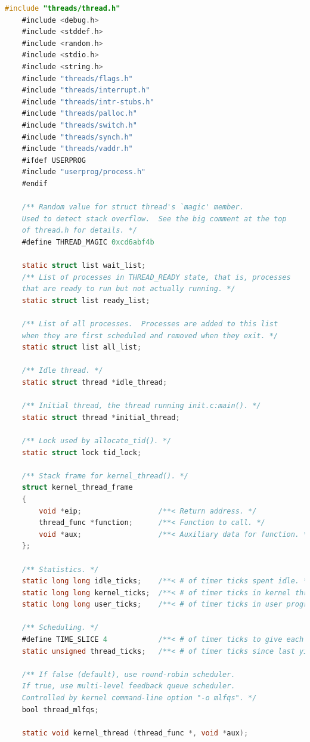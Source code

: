 \documentclass{article}
\begin{document}
\begin{lstlisting}[language=C, title=\texttt{pintos/src/threads/thread.c}]
	#include "threads/thread.h"
	#include <debug.h>
	#include <stddef.h>
	#include <random.h>
	#include <stdio.h>
	#include <string.h>
	#include "threads/flags.h"
	#include "threads/interrupt.h"
	#include "threads/intr-stubs.h"
	#include "threads/palloc.h"
	#include "threads/switch.h"
	#include "threads/synch.h"
	#include "threads/vaddr.h"
	#ifdef USERPROG
	#include "userprog/process.h"
	#endif
	
	/** Random value for struct thread's `magic' member.
	Used to detect stack overflow.  See the big comment at the top
	of thread.h for details. */
	#define THREAD_MAGIC 0xcd6abf4b
	
	static struct list wait_list;
	/** List of processes in THREAD_READY state, that is, processes
	that are ready to run but not actually running. */
	static struct list ready_list;
	
	/** List of all processes.  Processes are added to this list
	when they are first scheduled and removed when they exit. */
	static struct list all_list;
	
	/** Idle thread. */
	static struct thread *idle_thread;
	
	/** Initial thread, the thread running init.c:main(). */
	static struct thread *initial_thread;
	
	/** Lock used by allocate_tid(). */
	static struct lock tid_lock;
	
	/** Stack frame for kernel_thread(). */
	struct kernel_thread_frame 
	{
		void *eip;                  /**< Return address. */
		thread_func *function;      /**< Function to call. */
		void *aux;                  /**< Auxiliary data for function. */
	};
	
	/** Statistics. */
	static long long idle_ticks;    /**< # of timer ticks spent idle. */
	static long long kernel_ticks;  /**< # of timer ticks in kernel threads. */
	static long long user_ticks;    /**< # of timer ticks in user programs. */
	
	/** Scheduling. */
	#define TIME_SLICE 4            /**< # of timer ticks to give each thread. */
	static unsigned thread_ticks;   /**< # of timer ticks since last yield. */
	
	/** If false (default), use round-robin scheduler.
	If true, use multi-level feedback queue scheduler.
	Controlled by kernel command-line option "-o mlfqs". */
	bool thread_mlfqs;
	
	static void kernel_thread (thread_func *, void *aux);
	

\end{lstlisting}
\end{document}
